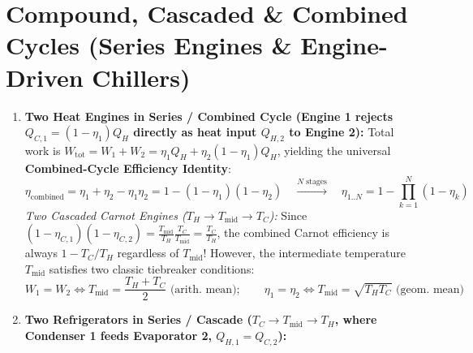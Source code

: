 \section{Compound, Cascaded \& Combined Cycles (Series Engines \& Engine-Driven Chillers)}\label{sec:09.7}

\begin{formulacard}
\begin{enumerate}
  \item \textbf{Two Heat Engines in Series / Combined Cycle (Engine 1 rejects $Q_{C,1} = (1 - \eta_1)Q_H$ directly as heat input $Q_{H,2}$ to Engine 2):}
  Total work is $W_{\mathrm{tot}} = W_1 + W_2 = \eta_1 Q_H + \eta_2(1 - \eta_1)Q_H$, yielding the universal \textbf{Combined-Cycle Efficiency Identity}:
  \begin{equation}\label{eq:09:cascade-engine}
    \boxed{\eta_{\mathrm{combined}} = \eta_1 + \eta_2 - \eta_1\eta_2 = 1 - (1 - \eta_1)(1 - \eta_2)} \quad \xrightarrow{N\text{ stages}} \quad \eta_{1..N} = 1 - \prod_{k=1}^N (1 - \eta_k)
  \end{equation}
  \emph{Two Cascaded Carnot Engines ($T_H \to T_{\mathrm{mid}} \to T_C$):} Since $(1 - \eta_{C,1})(1 - \eta_{C,2}) = \frac{T_{\mathrm{mid}}}{T_H}\frac{T_C}{T_{\mathrm{mid}}} = \frac{T_C}{T_H}$, the combined Carnot efficiency is always $1 - T_C/T_H$ regardless of $T_{\mathrm{mid}}$! However, the intermediate temperature $T_{\mathrm{mid}}$ satisfies two classic tiebreaker conditions:
  \begin{equation}\label{eq:09:carnot-mid}
    W_1 = W_2 \iff \boxed{T_{\mathrm{mid}} = \frac{T_H + T_C}{2} \text{ (arith.\ mean)}}; \qquad \eta_1 = \eta_2 \iff \boxed{T_{\mathrm{mid}} = \sqrt{T_H T_C} \text{ (geom.\ mean)}}
  \end{equation}
  \item \textbf{Two Refrigerators in Series / Cascade ($T_C \to T_{\mathrm{mid}} \to T_H$, where Condenser 1 feeds Evaporator 2, $Q_{H,1} = Q_{C,2}$):}

\end{enumerate}
\end{formulacard}
